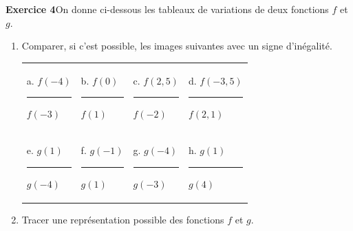 \documentclass[11pt,a4paper]{article}
\begin{document}
\newpage
\noindent\textbf{Exercice 4}\quad On donne ci-dessous les tableaux de variations de deux
fonctions $f$ et $g$.

\medskip
\noindent
\begin{minipage}{0.48\linewidth}
\centering
{}
\end{minipage}
\hfill
\begin{minipage}{0.48\linewidth}
\centering
{}
\end{minipage}

\medskip
\begin{enumerate}[leftmargin=*,itemsep=0.5em]
  \item Comparer, si c'est possible, les images suivantes avec un signe d'inégalité.
  \medskip

  \noindent\hspace*{-1.5em}\begin{tabular*}{\linewidth}{@{\extracolsep{\fill}}llll@{}}
    a. $f(-4)$ \rule{0.9cm}{0.4pt} $f(-3)$
      & b. $f(0)$ \rule{0.9cm}{0.4pt} $f(1)$
      & c. $f(2,\!5)$ \rule{0.9cm}{0.4pt} $f(-2)$
      & d. $f(-3,\!5)$ \rule{0.9cm}{0.4pt} $f(2,\!1)$ \\[1em]
    e. $g(1)$ \rule{0.9cm}{0.4pt} $g(-4)$
      & f. $g(-1)$ \rule{0.9cm}{0.4pt} $g(1)$
      & g. $g(-4)$ \rule{0.9cm}{0.4pt} $g(-3)$
      & h. $g(1)$ \rule{0.9cm}{0.4pt} $g(4)$
  \end{tabular*}

  \item Tracer une représentation possible des fonctions $f$ et $g$.
\end{enumerate}
\end{document}

